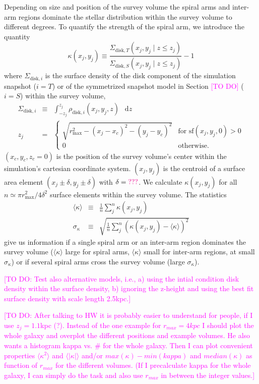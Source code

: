 \documentclass[iop,revtex4,numberedappendix,appendixfloats]{emulateapj}
\newcommand*\diff{\mathop{}\!\mathrm{d}}
\newcommand{\Wilma}[1]{\textcolor{Magenta}{#1}}
\begin{document}
Depending on size and position of the survey volume the spiral arms and inter-arm regions dominate the stellar distribution within the survey volume to different degrees. To quantify the strength of the spiral arm, we introduce the quantity
\begin{equation*}
\kappa(x_j,y_j) \equiv \frac{\Sigma_{\text{disk},T}(x_j,y_j \mid z\leq z_j)}{\Sigma_{\text{disk},S}(x_j,y_j \mid z\leq z_j)} -1
\end{equation*}
where $\Sigma_{\text{disk},i}$ is the surface density of the disk component  of the simulation snapshot ($i=T$) or of the symmetrized snapshot model in Section \Wilma{[TO DO]} ($i=S$) within the survey volume,
\begin{eqnarray*}
\Sigma_{\text{disk},i} &\equiv& \int_{-z_j}^{z_j} \rho_{\text{disk},i}(x_j,y_j,z) \ \diff z\\
z_j &=& \begin{cases}
\sqrt{r_\text{max}^2 - (x_j-x_c)^2 - (y_j-y_c)^2} & \text{for sf}(x_j,y_j,0) > 0\\
0 & \text{otherwise.}
\end{cases}
\end{eqnarray*}
$(x_c,y_c,z_c=0)$ is the position of the survey volume's center within the simulation's cartesian coordinate system. $(x_j,y_j)$ is the centroid of a surface area element $(x_j\pm\delta,y_j\pm \delta)$ with $\delta=\Wilma{???}$. We calculate $\kappa(x_j,y_j)$ for all $n \simeq \pi r_\text{max}^2/4\delta^2$ surface elements within the survey volume. The statistics
\begin{eqnarray*}
\langle \kappa \rangle &\equiv& \frac 1n \sum_j^n \kappa(x_j,y_j)\\
\sigma_\kappa &\equiv& \sqrt{\frac 1n \sum_j^n \left(\kappa(x_j,y_j) - \langle \kappa \rangle \right)^2}
\end{eqnarray*}
give us information if a single spiral arm or an inter-arm region dominates the survey volume ($\langle \kappa \rangle$ large for spiral arms, $\langle \kappa \rangle$ small for inter-arm regions, at small $\sigma_\kappa$) or if several spiral arms cross the survey volume (large $\sigma_\kappa$).

\Wilma{[TO DO: Test also alternative models, i.e., a) using the intial condition disk density within the surface density, b) ignoring the z-height and using the best fit surface density with scale length 2.5kpc.]}

\Wilma{[TO DO: After talking to HW it is probably easier to understand for people, if I use $z_j=1.1$kpc (?). Instead of the one example for $r_{max}=4kpc$ I should plot the whole galaxy and overplot the different positions and example volumes. He also wants a histogram kappa vs. # for the whole galaxy. Then I can plot convenient properties $\langle \kappa^2 \rangle$ and $\langle|\kappa|\rangle$ and/or $max(\kappa) - min(kappa)$ and $median(\kappa)$ as function of $r_{max}$ for the different volumes. (If I precalculate kappa for the whole galaxy, I can simply do the task and also use $r_{max}$ in between the integer values.]}
\end{document}

